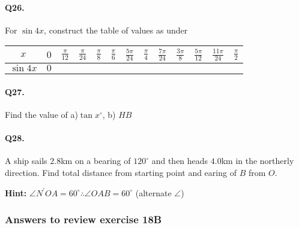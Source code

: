 \documentclass{article}
\begin{document}
\paragraph{Q26.}
For $\sin 4x$, construct the table of values as under

\begin{tabular}{|c|c|c|c|c|c|c|c|c|c|c|c|c|}
  \hline
  $x$ & $0$ & $\frac{\pi}{12}$ & $\frac{\pi}{24}$ & $\frac{\pi}{8}$ & $\frac{\pi}{6}$ & $\frac{5\pi}{24}$ & $\frac{\pi}{4}$ & $\frac{7\pi}{24}$ & $\frac{3\pi}{8}$ & $\frac{5\pi}{12}$ & $\frac{11\pi}{24}$ & $\frac{\pi}{2}$ \\[3pt]
  \hline
$\sin 4x$ & $0$ & & & & & & & & & & &\\
  \hline
\end{tabular}

\paragraph{Q27.}
Find the value of a)$\tan x^{\circ}$, b) $HB$


\paragraph{Q28.}
A ship sails $2.8$km on a bearing of $120^{\circ}$ and then heads $4.0$km in the northerly direction. Find total distance from starting point and earing of $B$ from $O$.

{\scriptsize \textbf{Hint:}}
$\angle N^{'}OA = 60^{\circ} \therefore \angle OAB = 60^{\circ}$ (alternate $\angle$)

\subsubsection {Answers to review exercise 18B}
\end{document}
